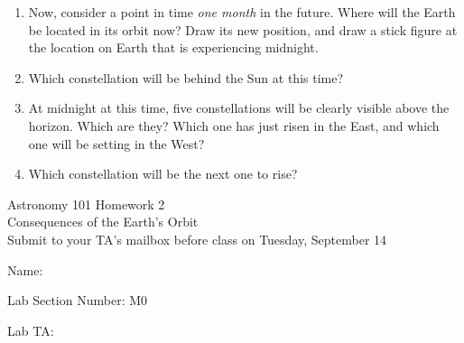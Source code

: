 \documentclass[12pt]{article}
\begin{document}
\begin{enumerate}
\vspace{1in}

\item Now, consider a point in time {\it one month} in the future. Where will the Earth be located in its orbit now? Draw its new position, and draw a stick figure at the location on Earth that is experiencing midnight. 

\vspace{1in}

\item Which constellation will be behind the Sun at this time?

\vspace{1in}

\item At midnight at this time, five constellations will be clearly visible above the horizon. Which are they? Which one has just risen in the East, and which one will be setting in the West? 

\vspace{1in}

\item Which constellation will be the next one to rise?


\newpage


\end{enumerate}



\begin{center}
	\sc \Large Astronomy 101 Homework 2 \\ \large Consequences of the Earth's Orbit\\
	\normalsize \rm Submit to your TA's mailbox before class on Tuesday, September 14
\end{center}
\begin{flushright}
	\Large
	
	Name: \underline{\hspace{2.7in}}
	
	Lab Section Number: M0\underline{\hspace{0.95in}}
	
	Lab TA: \underline{\hspace{2.5in}}
\end{flushright}
\end{document}
